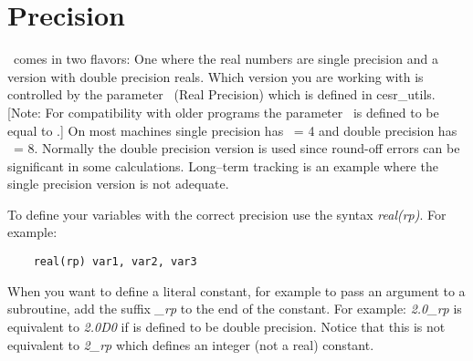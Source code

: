 \section{Precision}

\bmad\ comes in two flavors: One where the real numbers are single
precision and a version with double precision reals. Which version you
are working with is controlled by the parameter \rp\ (Real Precision)
which is defined in cesr\_utils. [Note: For compatibility with older
programs the parameter \rdef\ is defined to be equal to \rp.]  On most
machines single precision has \rp\ = 4 and double precision has \rp\ =
8. Normally the double precision version is used since round-off
errors can be significant in some calculations. Long--term tracking is
an example where the single precision version is not adequate. 

To define your variables with the correct precision use the syntax
{\it real(rp)}. For example:
\begin{verbatim}
    real(rp) var1, var2, var3
\end{verbatim}
When you want to define a literal constant, for example to pass an
argument to a subroutine, add the suffix {\it \_rp} to the end of the
constant. For example: {\it 2.0\_rp} is equivalent to {\it 2.0D0} if
\rp is defined to be double precision. Notice that this is not
equivalent to {\it 2\_rp} which defines an integer (not a real) constant.


